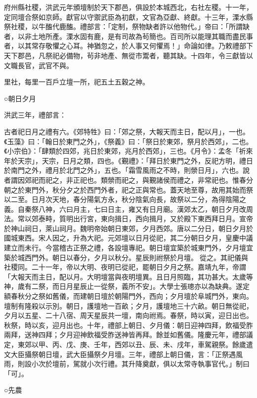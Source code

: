 府州縣社稷，洪武元年頒壇制於天下郡邑，俱設於本城西北，右社左稷。十一年，定同壇合祭如京師。獻官以守禦武臣為初獻，文官為亞獻、終獻。十三年，溧水縣祭社稷，以牛醢代鹿醢。禮部言：「定制，祭物缺者許以他物代。」帝曰：「所謂缺者，以非土地所產。溧水固有鹿，是有司故為茍簡也。百司所以能理其職而盡民事者，以其常存敬懼之心耳。神猶忽之，於人事又何懼焉！」命論如律。乃敕禮部下天下郡邑，凡祭祀必備物，茍非地產、無從市鬻者，聽其缺。十四年，令三獻皆以文職長官，武官不與。

里社，每里一百戶立壇一所，祀五土五穀之神。

○朝日夕月

洪武三年，禮部言：

古者祀日月之禮有六。《郊特牲》曰：「郊之祭，大報天而主日，配以月」，一也。《玉藻》曰：「翰日於東門之外」，《祭義》曰：「祭日於東郊，祭月於西郊」，二也。《小宗伯》：「肆類於四郊，兆日於東郊，兆月於西郊」，三也。《月令》：孟冬「祈來年於天宗」，天宗，日月之類，四也。《覲禮》：「拜日於東門之外，反祀方明，禮日於南門之外，禮月於北門之外」，五也。「霜雪風雨之不時，則禜日月」，六也。說者謂因郊祀而祀之，非正祀也。類禜而祀之，與覲諸侯而禮之，非常祀也。惟春分朝之於東門外，秋分夕之於西門外者，祀之正與常也。蓋天地至尊，故用其始而祭以二至。日月次天地，春分陽氣方永，秋分陰氣向長，故祭以二分，為得陰陽之義。自秦祭八神，六曰月主，七曰日主，雍又有日月廟。漢郊太乙，朝日夕月改周法。常以郊泰畤，質明出行宮，東向揖日，西向揖月，又於殿下東西拜日月。宣帝於神山祠日，萊山祠月。魏明帝始朝日東郊，夕月西郊。唐以二分日，朝日夕月於國城東西。宋人因之，升為大祀。元郊壇以日月從祀，其二分朝日夕月，皇慶中議建立而未行。今當稽古正祭之禮，各設壇專祀。朝日壇宜築於城東門外，夕月壇宜築於城西門外。朝日以春分，夕月以秋分。星辰則祔祭於月壇。從之。其祀儀與社稷同。二十一年，帝以大明、夜明已從祀，罷朝日夕月之祭。嘉靖九年，帝謂「大報天而主日，配以月。大明壇當與夜明壇異。且日月照臨，其功甚大。太歲等神，歲有二祭，而日月星辰止一從祭，義所不安」。大學士張璁亦以為缺典。遂定額春秋分之祭如舊儀，而建朝日壇於朝陽門外，西向；夕月壇於阜城門外，東向。壇制有隆殺以示別。朝日，護壇地一百畝；夕月，護壇地三十六畝。朝日無從祀，夕月以五星、二十八宿、周天星辰共一壇，南向祔焉。春祭，時以寅，迎日出也。秋祭，時以亥，迎月出也。十年，禮部上朝日、夕月儀：朝日迎神四拜，飲福受胙兩拜，送神四拜；夕月迎神飲福受胙送神皆再拜。餘並如舊儀。隆慶元年，禮部議定，東郊以甲、丙、戊、庚、壬年，西郊以丑、辰、未、戌年，車駕親祭。餘歲遣文大臣攝祭朝日壇，武大臣攝祭夕月壇。三年，禮部上朝日儀，言：「正祭遇風雨，則設小次於壇前，駕就小次行禮。其升降奠獻，俱以太常寺執事官代。」制曰「可」。

○先農

